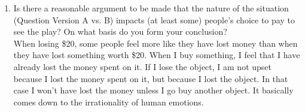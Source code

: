\documentclass{scrartcl}
\begin{document}
\begin{enumerate}
\item Is there a reasonable argument to be made that the nature of the situation (Question Version A vs. B) impacts (at least some) people’s choice to pay to see the play? On what basis do you form your conclusion?\\

  When losing \$20, some people feel more like they have lost money than when they have lost something worth \$20. When I buy something, I feel that I have already lost
the money spent on it. If I lose the object, I am not upset because I lost the money spent on it, but because I lost the object. In that case I won't have lost the money
unless I go buy another object. It basically comes down to the irrationality of human emotions.

\end{enumerate}
\end{document}
